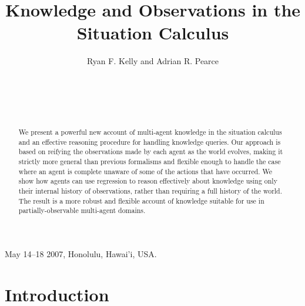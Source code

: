 \documentclass{ifaamas-submission}
\begin{document}
 {May 14--18 2007, Honolulu, Hawai'i, USA.}

\title{Knowledge and Observations in the Situation Calculus
}


\author{
\alignauthor
Ryan F. Kelly and Adrian R. Pearce\\
\\
\\
\\
\\
}

\maketitle

\begin{abstract}
We present a powerful new account of multi-agent knowledge in the
situation calculus and an effective reasoning procedure for handling
knowledge queries. Our approach is based on reifying the observations
made by each agent as the world evolves, making it strictly more general
than previous formalisms and flexible enough to handle the case where
an agent is complete unaware of some of the actions that have occurred.
We show how agents can use regression to reason effectively about knowledge
using only their internal history of observations,
rather than requiring a full history of the world. The result is a
more robust and flexible account of knowledge suitable for use in
partially-observable multi-agent domains. 
\end{abstract}




\section{Introduction}
\end{document}
